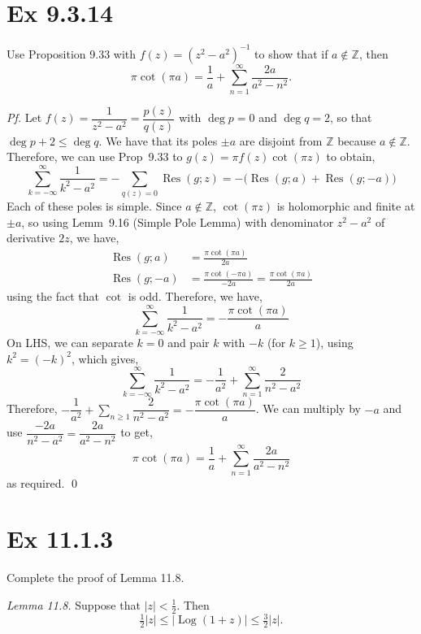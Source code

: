 \documentclass[a4paper]{article}
\DeclareMathOperator{\Res}{Res}
\DeclareMathOperator{\Log}{Log}
\newcommand{\Z}{\mathbb{Z}}
\begin{document}
\newpage
\section*{Ex 9.3.14}

\begin{prob}
Use Proposition 9.33 with $f(z)=(z^2-a^2)^{-1}$ to show that if $a\notin\Z$, then
\[
\pi\cot(\pi a)=\frac{1}{a}+\sum_{n=1}^{\infty}\frac{2a}{a^2-n^2}.
\]
\end{prob}

\textit{Pf.} Let $f(z)=\dfrac{1}{z^2-a^2}=\dfrac{p(z)}{q(z)}$ with $\deg p=0$ and
$\deg q=2$, so that $\deg p+2\le\deg q$. We have that its poles $\pm a$ are disjoint from
$\Z$ because $a\notin\Z$. Therefore, we can use Prop~9.33  to $g(z)=\pi f(z)\cot(\pi z)$ to obtain,
\[
\sum_{k=-\infty}^{\infty}\frac{1}{k^2-a^2}
=-\sum_{q(z)=0}\Res(g;z)=-\bigl(\Res(g;a)+\Res(g;-a)\bigr)
\]
Each of these poles is simple. Since $a\notin\Z$, $\cot(\pi z)$ is holomorphic and finite
at $\pm a$, so using Lemm~9.16 (Simple Pole Lemma) with denominator $z^2-a^2$ of derivative $2z$, we have,
\begin{align*}
\Res(g;a) &=\frac{\pi\cot(\pi a)}{2a} \\
\Res(g;-a) &=\frac{\pi\cot(-\pi a)}{-2a}=\frac{\pi\cot(\pi a)}{2a}
\end{align*}
using the fact that $\cot$ is odd. Therefore, we have,
\[
\sum_{k=-\infty}^{\infty}\frac{1}{k^2-a^2}=-\frac{\pi\cot(\pi a)}{a}
\]
On LHS, we can separate $k=0$ and pair $k$ with $-k$ (for $k\ge 1$), using $k^2=(-k)^2$, which gives,
\[
\sum_{k=-\infty}^{\infty}\frac{1}{k^2-a^2}
=-\frac{1}{a^2}+\sum_{n=1}^{\infty}\frac{2}{n^2-a^2}
\]
Therefore, $-\dfrac{1}{a^2}+\sum_{n\ge 1}\dfrac{2}{n^2-a^2}
=-\dfrac{\pi\cot(\pi a)}{a}$. We can multiply by $-a$ and use
$\dfrac{-2a}{n^2-a^2}=\dfrac{2a}{a^2-n^2}$ to get,
\[
\pi\cot(\pi a)=\frac{1}{a}+\sum_{n=1}^{\infty}\frac{2a}{a^2-n^2}
\]
as required. \qed

\newpage
\section*{Ex 11.1.3}

\begin{prob}
Complete the proof of Lemma 11.8.

\medskip
\emph{Lemma 11.8.} Suppose that $|z|<\tfrac12$. Then
\[
\tfrac12|z|\le|\Log(1+z)|\le\tfrac32|z|.
\]
\end{prob}
\end{document}
